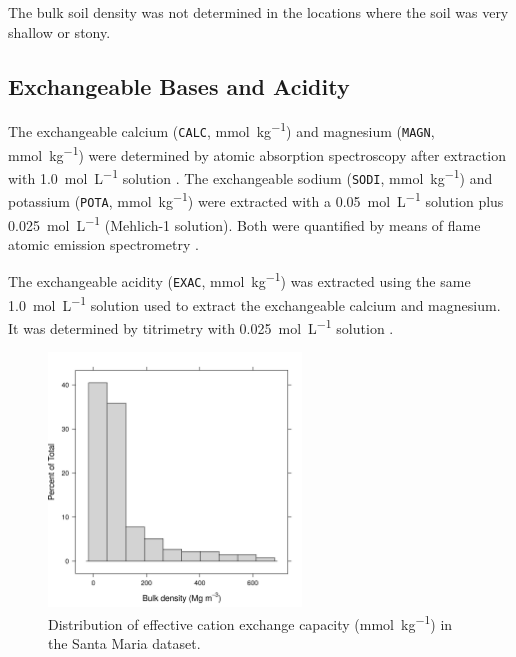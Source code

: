 The bulk soil density was not determined in the locations where the soil was very shallow or stony.

\subsection{Exchangeable Bases and Acidity}
\label{chap:chap04-ecec}

The exchangeable calcium (\texttt{CALC}, \si{\milli\mole\per\kilo\gram}) and magnesium (\texttt{MAGN}, 
\si{\milli\mole\per\kilo\gram}) were determined by atomic absorption spectroscopy after extraction with 
\SI{1.0}{\mole\per\liter}  solution \cite{ClaessenEtAl1997}. The exchangeable sodium (\texttt{SODI}, 
\si{\milli\mole\per\kilo\gram}) and potassium (\texttt{POTA}, \si{\milli\mole\per\kilo\gram}) were extracted 
with a \SI{0.05}{\mole\per\liter}  solution plus \SI{0.025}{\mole\per\liter}  
(Mehlich-\num{1} solution). Both were quantified by means of flame atomic emission spectrometry 
\cite{TedescoEtAl1995}.

The exchangeable acidity (\texttt{EXAC}, \si{\milli\mole\per\kilo\gram}) was extracted using the same 
\SI{1.0}{\mole\per\liter}  solution used to extract the exchangeable calcium and magnesium. It was 
determined by titrimetry with \SI{0.025}{\mole\per\liter}  solution \cite{ClaessenEtAl1997}.


\begin{figure}[!ht]
\centering
\includegraphics[width=0.60\textwidth]{fig/chap04-ecec}
\caption[Distribution of effective cation exchange capacity in the Santa Maria dataset.]{Distribution of 
effective cation exchange capacity (\si{\milli\mole\per\kilo\gram}) in the Santa Maria dataset.}
\label{fig:chap04-ecec}
\end{figure}


